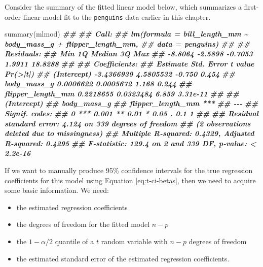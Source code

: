 \documentclass[
]{book}
\newenvironment{Shaded}{\begin{snugshade}}{\end{snugshade}}
\newcommand{\DocumentationTok}[1]{\textcolor[rgb]{0.56,0.35,0.01}{\textbf{\textit{#1}}}}
\newcommand{\FunctionTok}[1]{\textcolor[rgb]{0.00,0.00,0.00}{#1}}
\newcommand{\NormalTok}[1]{#1}
\providecommand{\tightlist}{%
  \setlength{\itemsep}{0pt}\setlength{\parskip}{0pt}}
\theoremstyle{definition}
\theoremstyle{definition}
\theoremstyle{definition}
\theoremstyle{definition}
\theoremstyle{remark}
\begin{document}
Consider the summary of the fitted linear model below, which summarizes a first-order linear model fit to the \texttt{penguins} data earlier in this chapter.

\begin{Shaded}
\begin{Highlighting}[]
\FunctionTok{summary}\NormalTok{(mlmod)}
\DocumentationTok{\#\# }
\DocumentationTok{\#\# Call:}
\DocumentationTok{\#\# lm(formula = bill\_length\_mm \textasciitilde{} body\_mass\_g + flipper\_length\_mm, }
\DocumentationTok{\#\#     data = penguins)}
\DocumentationTok{\#\# }
\DocumentationTok{\#\# Residuals:}
\DocumentationTok{\#\#     Min      1Q  Median      3Q     Max }
\DocumentationTok{\#\# {-}8.8064 {-}2.5898 {-}0.7053  1.9911 18.8288 }
\DocumentationTok{\#\# }
\DocumentationTok{\#\# Coefficients:}
\DocumentationTok{\#\#                     Estimate Std. Error t value Pr(\textgreater{}|t|)}
\DocumentationTok{\#\# (Intercept)       {-}3.4366939  4.5805532  {-}0.750    0.454}
\DocumentationTok{\#\# body\_mass\_g        0.0006622  0.0005672   1.168    0.244}
\DocumentationTok{\#\# flipper\_length\_mm  0.2218655  0.0323484   6.859 3.31e{-}11}
\DocumentationTok{\#\#                      }
\DocumentationTok{\#\# (Intercept)          }
\DocumentationTok{\#\# body\_mass\_g          }
\DocumentationTok{\#\# flipper\_length\_mm ***}
\DocumentationTok{\#\# {-}{-}{-}}
\DocumentationTok{\#\# Signif. codes:  }
\DocumentationTok{\#\# 0 \textquotesingle{}***\textquotesingle{} 0.001 \textquotesingle{}**\textquotesingle{} 0.01 \textquotesingle{}*\textquotesingle{} 0.05 \textquotesingle{}.\textquotesingle{} 0.1 \textquotesingle{} \textquotesingle{} 1}
\DocumentationTok{\#\# }
\DocumentationTok{\#\# Residual standard error: 4.124 on 339 degrees of freedom}
\DocumentationTok{\#\#   (2 observations deleted due to missingness)}
\DocumentationTok{\#\# Multiple R{-}squared:  0.4329, Adjusted R{-}squared:  0.4295 }
\DocumentationTok{\#\# F{-}statistic: 129.4 on 2 and 339 DF,  p{-}value: \textless{} 2.2e{-}16}
\end{Highlighting}
\end{Shaded}

If we want to manually produce 95\% confidence intervals for the true regression coefficients for this model using Equation \eqref{eq:t-ci-betas}, then we need to acquire some basic information. We need:

\begin{itemize}
\tightlist
\item
  the estimated regression coefficients
\item
  the degrees of freedom for the fitted model \(n-p\)
\item
  the \(1-\alpha/2\) quantile of a \(t\) random variable with \(n-p\) degrees of freedom
\item
  the estimated standard error of the estimated regression coefficients.
\end{itemize}
\end{document}
